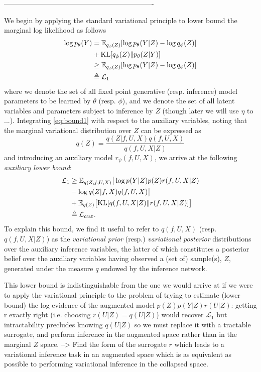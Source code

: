\documentclass[]{article}
\newcommand{\Ex}{\mathbb{E}}
\newcommand{\KL}{\textrm{KL}}
\newcommand{\f}{f}
\begin{document}
----------------------------------------------------------------

We begin by applying the standard variational principle to lower bound the marginal log likelihood as follows
%
\begin{align}
\log p_\theta(Y) &= \Ex_{q_\phi(Z)}[\log p_\theta(Y|Z) - \log q_\phi(Z)]\notag\\
&+ \text{KL}[q_\phi(Z)\Vert p_\theta(Z|Y)]\label{eq:var_principle}\\
&\geq \Ex_{q_\phi(Z)}[\log p_\theta(Y|Z) - \log q_\phi(Z)] \notag \\
&\triangleq \mathcal{L}_1 \label{eq:bound1}
\end{align}
%
where we denote the set of all fixed point generative (resp. inference) model parameters to be learned by $\theta$ (resp. $\phi$), and we denote the set of all latent variables and parameters subject to inference by $Z$ (though later we will use $\eta$ to ...).
Integrating \ref{eq:bound1} with respect to the auxiliary variables, noting that the marginal variational distribution over $Z$ can be expressed as 
\begin{equation}
q(Z) = \frac{q(Z|\f,U,X)q(\f,U,X)}{q(\f,U,X|Z)}
\end{equation}
%
and introducing an auxiliary model $r_\psi(\f,U,X)$, we arrive at the following \emph{auxiliary lower bound}:
%
\begin{align}
\mathcal{L}_1 &\geq \Ex_{q(Z,\f,U,X)}\big[ \log p(Y|Z)p(Z)r(\f,U,X|Z) \notag \\
&- \log q(Z|\f,X)q(\f,U,X) \big] \notag \\
&+ \Ex_{q(Z)}\big[\KL[q(\f,U,X|Z)\Vert r(\f,U,X|Z)]\big] \label{eq:lowerlower} \\
&\triangleq \mathcal{L}_{aux}. \label{eq:L_aux}
\end{align}
%
To explain this bound, we find it useful to refer to $q(\f,U,X)$ (resp. $q(\f,U,X|Z)$) as the \emph{variational prior} (resp.) \emph{variational posterior} distributions over the auxiliary inference variables, the latter of which constitutes a posterior belief over the auxiliary variables having observed a (set of) sample(s), $Z$, generated under the measure $q$ endowed by the inference network.

This lower bound is indistinguishable from the one we would arrive at if we were to apply the variational principle to the problem of trying to estimate (lower bound) the log evidence of the augmented model $p(Z)p(Y|Z)r(U|Z)$: getting r exactly right (i.e. choosing $r(U|Z)=q(U|Z)$) would recover $\mathcal{L}_1$ but intractability precludes knowing $q(U|Z)$ so we must replace it with a tractable surrogate, and perform inference in the augmented space rather than in the marginal $Z$ space.
--> Find the form of the surrogate $r$ which leads to a variational inference task in an augmented space which is as equivalent as possible to performing variational inference in the collapsed space.
\end{document}
